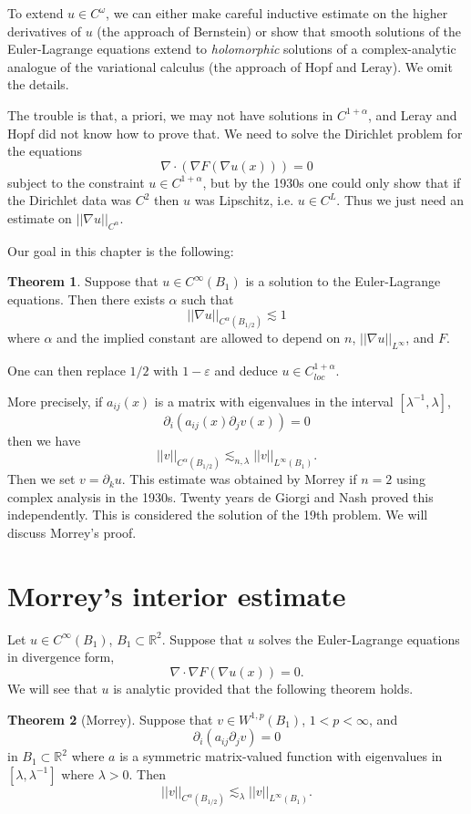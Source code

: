 \documentclass[12pt]{book}
\newcommand{\RR}{\mathbb{R}}
\theoremstyle{definition}
\newtheorem{theorem}{Theorem}[chapter]
\begin{document}
To extend $u \in C^\omega$, we can either make careful inductive estimate on the higher derivatives of $u$ (the approach of Bernstein) or show that smooth solutions of the Euler-Lagrange equations extend to \emph{holomorphic} solutions of a complex-analytic analogue of the variational calculus (the approach of Hopf and Leray).
We omit the details.

The trouble is that, a priori, we may not have solutions in $C^{1 + \alpha}$, and Leray and Hopf did not know how to prove that.
We need to solve the Dirichlet problem for the equations
$$\nabla \cdot (\nabla F(\nabla u(x))) = 0$$
subject to the constraint $u \in C^{1 + \alpha}$, but by the 1930s one could only show that if the Dirichlet data was $C^2$ then $u$ was Lipschitz, i.e. $u \in C^L$.
Thus we just need an estimate on $||\nabla u||_{C^\alpha}$.

Our goal in this chapter is the following:
\begin{theorem}
Suppose that $u \in C^\infty(B_1)$ is a solution to the Euler-Lagrange equations.
Then there exists $\alpha$ such that
$$||\nabla u||_{C^\alpha(B_{1/2})} \lesssim 1$$
where $\alpha$ and the implied constant are allowed to depend on $n$, $||\nabla u||_{L^\infty}$, and $F$.
\end{theorem}
One can then replace $1/2$ with $1-\varepsilon$ and deduce $u \in C^{1 + \alpha}_{loc}$.

More precisely, if $a_{ij}(x)$ is a matrix with eigenvalues in the interval $[\lambda^{-1}, \lambda]$,
$$\partial_i (a_{ij}(x) \partial_j v(x)) = 0$$
then we have
$$||v||_{C^\alpha(B_{1/2})} \lesssim_{n, \lambda} ||v||_{L^\infty(B_1)}.$$
Then we set $v = \partial_k u$.
This estimate was obtained by Morrey if $n = 2$ using complex analysis in the 1930s.
Twenty years de Giorgi and Nash proved this independently.
This is considered the solution of the 19th problem.
We will discuss Morrey's proof.

\section{Morrey's interior estimate}
Let $u \in C^\infty(B_1)$, $B_1 \subset \RR^2$.
Suppose that $u$ solves the Euler-Lagrange equations in divergence form,
$$\nabla \cdot \nabla F(\nabla u(x)) = 0.$$
We will see that $u$ is analytic provided that the following theorem holds.

\begin{theorem}[Morrey]
Suppose that $v \in W^{1,p}(B_1)$, $1 < p < \infty$, and
\begin{equation}
\label{Linear Morrey}
\partial_i(a_{ij}\partial_jv) = 0
\end{equation}
in $B_1 \subset \RR^2$ where $a$ is a symmetric matrix-valued function with eigenvalues in $[\lambda, \lambda^{-1}]$ where $\lambda > 0$.
Then
$$||v||_{C^\alpha(B_{1/2})} \lesssim_\lambda ||v||_{L^\infty(B_1)}.$$
\end{theorem}
\end{document}
